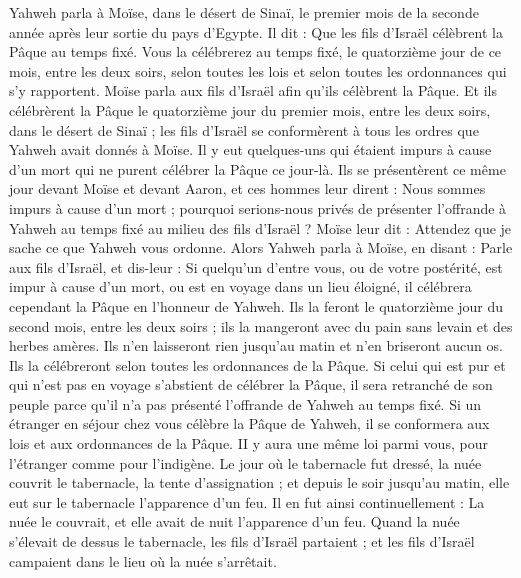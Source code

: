 \begin{multicols}{2}
\VerseOne{}Yahweh parla à Moïse, dans le désert de Sinaï, le premier mois de la seconde année après leur sortie du pays d'Egypte. Il dit :
Que les fils d'Israël célèbrent la Pâque au temps fixé.
Vous la célébrerez au temps fixé, le quatorzième jour de ce mois, entre les deux soirs, selon toutes les lois et selon toutes les ordonnances qui s’y rapportent.
Moïse parla aux fils d'Israël afin qu'ils célèbrent la Pâque.
Et ils célébrèrent la Pâque le quatorzième jour du premier mois, entre les deux soirs, dans le désert de Sinaï ; les fils d'Israël se conformèrent à tous les ordres que Yahweh avait donnés à Moïse.
Il y eut quelques-uns qui étaient impurs à cause d’un mort qui ne purent célébrer la Pâque ce jour-là. Ils se présentèrent ce même jour devant Moïse et devant Aaron,
et ces hommes leur dirent : Nous sommes impurs à cause d’un mort ; pourquoi serions-nous privés de présenter l'offrande à Yahweh au temps fixé au milieu des fils d'Israël ?
Moïse leur dit : Attendez que je sache ce que Yahweh vous ordonne.
Alors Yahweh parla à Moïse, en disant :
Parle aux fils d'Israël, et dis-leur : Si quelqu'un d'entre vous, ou de votre postérité, est impur à cause d’un mort, ou est en voyage dans un lieu éloigné, il célébrera cependant la Pâque en l’honneur de Yahweh.
Ils la feront le quatorzième jour du second mois, entre les deux soirs ; ils la mangeront avec du pain sans levain et des herbes amères.
Ils n'en laisseront rien jusqu'au matin et n'en briseront aucun os. Ils la célébreront selon toutes les ordonnances de la Pâque.
Si celui qui est pur et qui n’est pas en voyage s’abstient de célébrer la Pâque, il sera retranché de son peuple parce qu'il n'a pas présenté l'offrande de Yahweh au temps fixé.
Si un étranger en séjour chez vous célèbre la Pâque de Yahweh, il se conformera aux lois et aux ordonnances de la Pâque. II y aura une même loi parmi vous, pour l'étranger comme pour l’indigène.
Le jour où le tabernacle fut dressé, la nuée couvrit le tabernacle, la tente d’assignation ; et depuis le soir jusqu’au matin, elle eut sur le tabernacle l’apparence d’un feu.
Il en fut ainsi continuellement : La nuée le couvrait, et elle avait de nuit l’apparence d’un feu.
Quand la nuée s’élevait de dessus le tabernacle, les fils d'Israël partaient ; et les fils d'Israël campaient dans le lieu où la nuée s'arrêtait.

\end{multicols}

